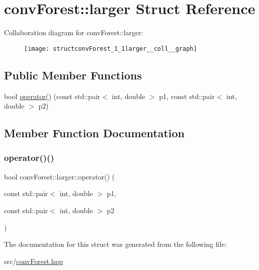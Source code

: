 \hypertarget{structconvForest_1_1larger}{}\section{conv\+Forest\+:\+:larger Struct Reference}
\label{structconvForest_1_1larger}


Collaboration diagram for conv\+Forest\+:\+:larger\+:\nopagebreak
\begin{figure}[H]
\begin{center}
\leavevmode
\texttt{[image: structconvForest\_1\_1larger\_\_coll\_\_graph]}
\end{center}
\end{figure}
\subsection*{Public Member Functions}
\begin{DoxyCompactItemize}
\item 
bool \hyperlink{structconvForest_1_1larger_a1abbac0ea812a054a6572dd5046a9901}{operator()} (const std\+::pair$<$ int, double $>$ p1, const std\+::pair$<$ int, double $>$ p2)
\end{DoxyCompactItemize}


\subsection{Member Function Documentation}
\mbox{\label{structconvForest_1_1larger_a1abbac0ea812a054a6572dd5046a9901}} 
\subsubsection{\texorpdfstring{operator()()}{operator()()}}
{\footnotesize\ttfamily bool conv\+Forest\+::larger\+::operator() (\begin{DoxyParamCaption}\item[{const std\+::pair$<$ int, double $>$}]{p1,  }\item[{const std\+::pair$<$ int, double $>$}]{p2 }\end{DoxyParamCaption})\hspace{0.3cm}{\ttfamily [inline]}}



The documentation for this struct was generated from the following file\+:\begin{DoxyCompactItemize}
\item 
src/\hyperlink{convForest_8hpp}{conv\+Forest.\+hpp}\end{DoxyCompactItemize}
